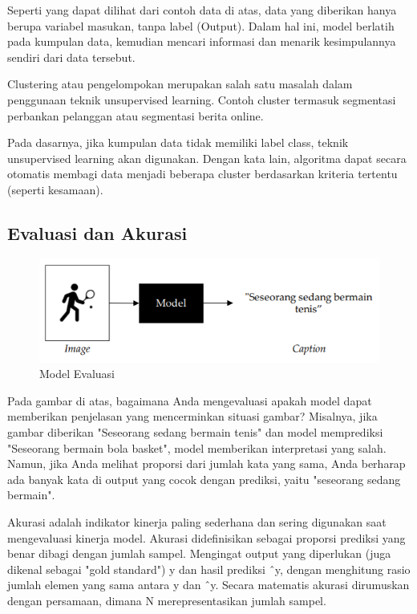 \par Seperti yang dapat dilihat dari contoh data di atas, data yang diberikan hanya berupa variabel masukan, tanpa label (Output). Dalam hal ini, model berlatih pada kumpulan data, kemudian mencari informasi dan menarik kesimpulannya sendiri dari data tersebut.

\par Clustering atau pengelompokan merupakan salah satu masalah dalam penggunaan teknik unsupervised learning. Contoh cluster termasuk segmentasi perbankan pelanggan atau segmentasi berita online.

\par Pada dasarnya, jika kumpulan data tidak memiliki label class, teknik unsupervised learning akan digunakan. Dengan kata lain, algoritma dapat secara otomatis membagi data menjadi beberapa cluster berdasarkan kriteria tertentu (seperti kesamaan).\cite{learning}

\subsection{Evaluasi dan Akurasi}

\begin{figure}[H]
    \centering
    \includegraphics[width=12cm]{figures/chapter2/4.PNG}
    \caption{Model Evaluasi}
\end{figure}

\par Pada gambar di atas, bagaimana Anda mengevaluasi apakah model dapat memberikan penjelasan yang mencerminkan situasi gambar? Misalnya, jika gambar diberikan "Seseorang sedang bermain tenis" dan model memprediksi "Seseorang bermain bola basket", model memberikan interpretasi yang salah. Namun, jika Anda melihat proporsi dari jumlah kata yang sama, Anda berharap ada banyak kata di output yang cocok dengan prediksi, yaitu "seseorang sedang bermain".\cite{evaaku}

\par Akurasi adalah indikator kinerja paling sederhana dan sering digunakan saat mengevaluasi kinerja model. Akurasi didefinisikan sebagai proporsi prediksi yang benar dibagi dengan jumlah sampel. Mengingat output yang diperlukan (juga dikenal sebagai "gold standard") y dan hasil prediksi ˆy, dengan menghitung rasio jumlah elemen yang sama antara y dan ˆy. Secara matematis akurasi dirumuskan dengan persamaan, dimana N merepresentasikan jumlah sampel.\cite{evaaku}

